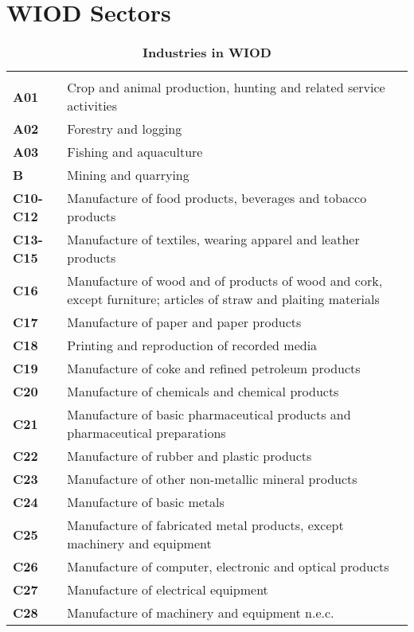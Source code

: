 \documentclass[11pt,a4paper]{article}
\begin{document}
\newpage


\newpage
\appendix
\section{WIOD Sectors}
\begin{table}[!h]
 \centering
 \caption{\footnotesize{\textbf{Industries in WIOD}}}
 \footnotesize
 \begin{tabular}{ll}
  \hline \\
\textbf{A01} &{Crop and animal production, hunting and related service activities}\\
\textbf{A02} &{Forestry and logging}\\
\textbf{A03} &{Fishing and aquaculture}\\
\textbf{B} &{Mining and quarrying}\\
\textbf{C10-C12} &{Manufacture of food products, beverages and tobacco products}\\
\textbf{C13-C15} &{Manufacture of textiles, wearing apparel and leather products}\\
\textbf{C16} &{Manufacture of wood and of products of wood and cork, except furniture; articles of straw and plaiting materials}\\
\textbf{C17} &{Manufacture of paper and paper products}\\
\textbf{C18} &{Printing and reproduction of recorded media}\\
\textbf{C19} &{Manufacture of coke and refined petroleum products}\\
\textbf{C20} &{Manufacture of chemicals and chemical products}\\
\textbf{C21} &{Manufacture of basic pharmaceutical products and pharmaceutical preparations}\\
\textbf{C22} &{Manufacture of rubber and plastic products}\\
\textbf{C23} &{Manufacture of other non-metallic mineral products}\\
\textbf{C24} &{Manufacture of basic metals}\\
\textbf{C25} &{Manufacture of fabricated metal products, except machinery and equipment}\\
\textbf{C26} &{Manufacture of computer, electronic and optical products}\\
\textbf{C27} &{Manufacture of electrical equipment}\\
\textbf{C28} &{Manufacture of machinery and equipment n.e.c.}\\

\end{tabular}
\end{table}
\end{document}
